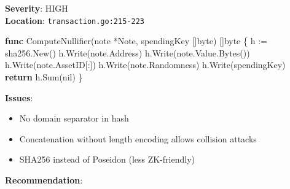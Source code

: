 \documentclass[
]{article}
\newenvironment{Shaded}{}{}
\newcommand{\ControlFlowTok}[1]{\textcolor[rgb]{0.00,0.44,0.13}{\textbf{#1}}}
\newcommand{\DataTypeTok}[1]{\textcolor[rgb]{0.56,0.13,0.00}{#1}}
\newcommand{\KeywordTok}[1]{\textcolor[rgb]{0.00,0.44,0.13}{\textbf{#1}}}
\newcommand{\NormalTok}[1]{#1}
\newcommand{\OperatorTok}[1]{\textcolor[rgb]{0.40,0.40,0.40}{#1}}
\newcommand{\OtherTok}[1]{\textcolor[rgb]{0.00,0.44,0.13}{#1}}
\providecommand{\tightlist}{%
  \setlength{\itemsep}{0pt}\setlength{\parskip}{0pt}}
\begin{document}
\textbf{Severity}: HIGH\\
\textbf{Location}: \texttt{transaction.go:215-223}

\begin{Shaded}
\begin{Highlighting}[]
\KeywordTok{func}\NormalTok{ ComputeNullifier}\OperatorTok{(}\NormalTok{note }\OperatorTok{*}\NormalTok{Note}\OperatorTok{,}\NormalTok{ spendingKey }\OperatorTok{[]}\DataTypeTok{byte}\OperatorTok{)} \OperatorTok{[]}\DataTypeTok{byte} \OperatorTok{\{}
\NormalTok{    h }\OperatorTok{:=}\NormalTok{ sha256}\OperatorTok{.}\NormalTok{New}\OperatorTok{()}
\NormalTok{    h}\OperatorTok{.}\NormalTok{Write}\OperatorTok{(}\NormalTok{note}\OperatorTok{.}\NormalTok{Address}\OperatorTok{)}
\NormalTok{    h}\OperatorTok{.}\NormalTok{Write}\OperatorTok{(}\NormalTok{note}\OperatorTok{.}\NormalTok{Value}\OperatorTok{.}\NormalTok{Bytes}\OperatorTok{())}
\NormalTok{    h}\OperatorTok{.}\NormalTok{Write}\OperatorTok{(}\NormalTok{note}\OperatorTok{.}\NormalTok{AssetID}\OperatorTok{[:])}
\NormalTok{    h}\OperatorTok{.}\NormalTok{Write}\OperatorTok{(}\NormalTok{note}\OperatorTok{.}\NormalTok{Randomness}\OperatorTok{)}
\NormalTok{    h}\OperatorTok{.}\NormalTok{Write}\OperatorTok{(}\NormalTok{spendingKey}\OperatorTok{)}
    \ControlFlowTok{return}\NormalTok{ h}\OperatorTok{.}\NormalTok{Sum}\OperatorTok{(}\OtherTok{nil}\OperatorTok{)}
\OperatorTok{\}}
\end{Highlighting}
\end{Shaded}

\textbf{Issues}:

\begin{itemize}
\tightlist
\item
  No domain separator in hash
\item
  Concatenation without length encoding allows collision attacks
\item
  SHA256 instead of Poseidon (less ZK-friendly)
\end{itemize}

\textbf{Recommendation}:
\end{document}
